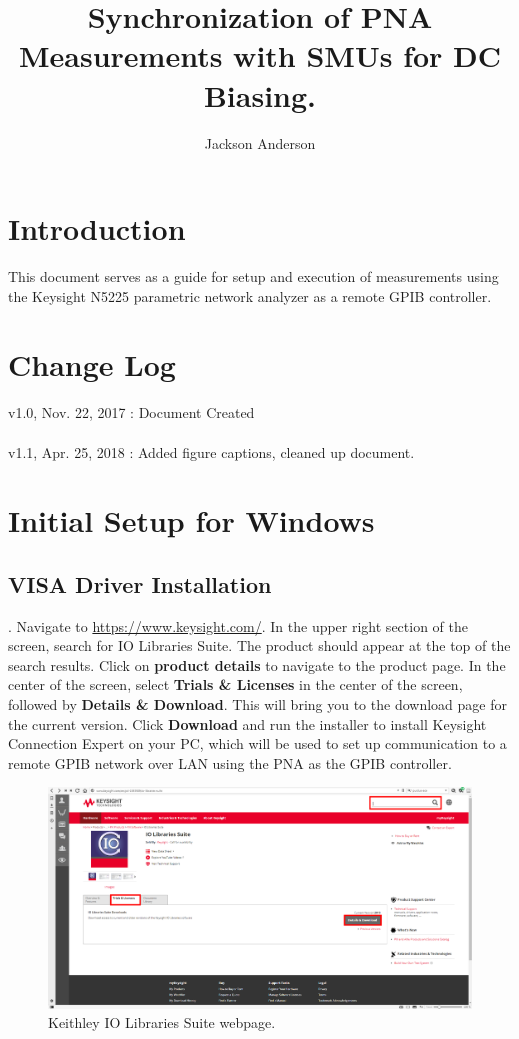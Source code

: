 \documentclass[]{article}
\title{Synchronization of PNA Measurements with SMUs for DC Biasing.}
\author{Jackson Anderson}
\begin{document}
\maketitle


\section{Introduction}
This document serves as a guide for setup and execution of measurements using the Keysight N5225 parametric network analyzer as a remote GPIB controller. 


\section{Change Log}

v1.0, Nov. 22, 2017 : Document Created
\\ \\
v1.1, Apr. 25, 2018 : Added figure captions, cleaned up document.


\newpage
\section{Initial Setup for Windows}

\subsection{VISA Driver Installation}

\ex. Navigate to \url{https://www.keysight.com/}. In the upper right section of the screen, search for IO Libraries Suite. The product should appear at the top of the search results. Click on \textbf{product details} to navigate to the product page. In the center of the screen, select \textbf{Trials \& Licenses} in the center of the screen, followed by \textbf{Details \& Download}. This will bring you to the download page for the current version. Click \textbf{Download} and run the installer to install Keysight Connection Expert on your PC, which will be used to set up communication to a remote GPIB network over LAN using the PNA as the GPIB controller. 

\begin{figure}[H]
	\centering
	\includegraphics[width=\linewidth]{Figures/keysight}
	\caption{Keithley IO Libraries Suite webpage.}
	\label{fig:kcon}
\end{figure}
\end{document}
